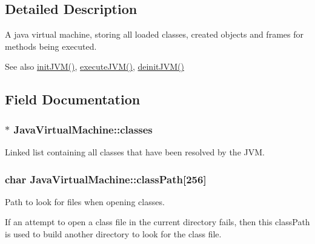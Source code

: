 \subsection{Detailed Description}
A java virtual machine, storing all loaded classes, created objects and frames for methods being executed. 

\begin{DoxySeeAlso}{See also}
\hyperlink{jvm_8c_aca189885e78ec25ece5d7f70e83022a1}{init\+J\+V\+M()}, \hyperlink{jvm_8c_a38b6a19996260e30af5a369a9588dc31}{execute\+J\+V\+M()}, \hyperlink{jvm_8c_a65269d70951aacfe829c89c078dad67a}{deinit\+J\+V\+M()} 
\end{DoxySeeAlso}


\subsection{Field Documentation}
\subsubsection[{\texorpdfstring{classes}{classes}}]{$\ast$ Java\+Virtual\+Machine\+::classes}\hypertarget{structJavaVirtualMachine_a36266aec8ba9d25b4d9f67509967dd4c}{}\label{structJavaVirtualMachine_a36266aec8ba9d25b4d9f67509967dd4c}


Linked list containing all classes that have been resolved by the J\+VM. 

\subsubsection[{\texorpdfstring{class\+Path}{classPath}}]{\setlength{\rightskip}{0pt plus 5cm}char Java\+Virtual\+Machine\+::class\+Path\mbox{[}256\mbox{]}}\hypertarget{structJavaVirtualMachine_a62e35894409c262231bcae405b4e291b}{}\label{structJavaVirtualMachine_a62e35894409c262231bcae405b4e291b}


Path to look for files when opening classes. 

If an attempt to open a class file in the current directory fails, then this class\+Path is used to build another directory to look for the class file. 
